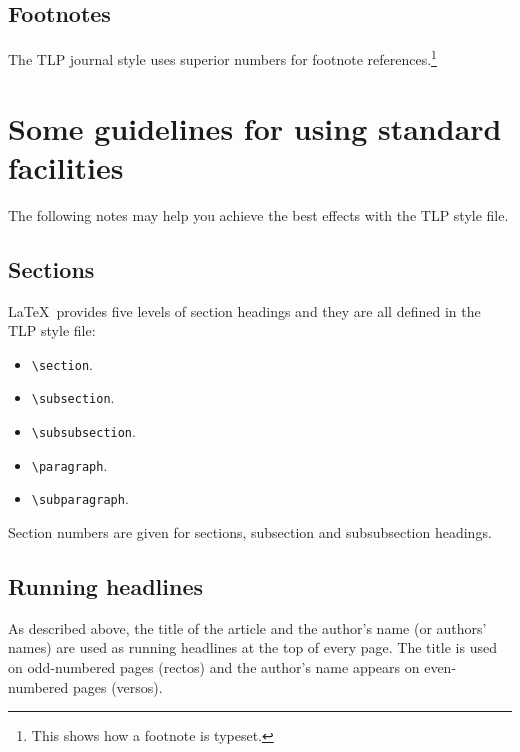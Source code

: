 \documentclass{tlp}
\begin{document}
\subsection{Footnotes}

The TLP journal style uses superior numbers for footnote
references.\footnote{This shows how a footnote is typeset.}

\section{Some guidelines for using standard facilities}

The following notes may help you achieve the best effects with the TLP style
file.

\subsection{Sections}

\LaTeX\ provides five levels of section headings and they are all
defined in the TLP style file:
\begin{itemize}
  \item \verb"\section".
  \item \verb"\subsection".
  \item \verb"\subsubsection".
  \item \verb"\paragraph".
  \item \verb"\subparagraph".
\end{itemize}
Section numbers are given for sections, subsection and subsubsection headings.

\subsection{Running headlines}

As described above, the title of the article and the author's name (or authors'
names) are used as running headlines at the top of every page.
The title is used on odd-numbered pages (rectos) and the author's name appears
on even-numbered pages (versos).
\end{document}
